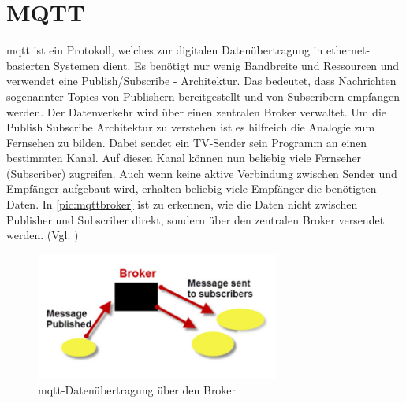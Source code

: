 \section{MQTT} %
\acrshort{mqtt} ist ein Protokoll, welches zur digitalen Datenübertragung in ethernet-basierten Systemen dient. Es benötigt nur wenig Bandbreite und Ressourcen und verwendet eine 
Publish/Subscribe - Architektur. Das bedeutet, dass Nachrichten sogenannter Topics von Publishern bereitgestellt und von Subscribern empfangen werden. Der Datenverkehr wird über einen 
zentralen Broker verwaltet. Um die Publish Subscribe Architektur zu verstehen ist es hilfreich die Analogie zum Fernsehen zu bilden. Dabei sendet ein TV-Sender sein Programm an einen bestimmten Kanal.
Auf diesen Kanal können nun beliebig viele Fernseher (Subscriber) zugreifen. Auch wenn keine aktive Verbindung zwischen Sender und Empfänger aufgebaut wird, erhalten beliebig viele Empfänger die benötigten Daten.
In \autoref{pic:mqttbroker} ist zu erkennen, wie die Daten nicht zwischen Publisher und Subscriber direkt, sondern über den zentralen Broker versendet werden. (Vgl. \cite{mqtt})

\begin{figure}[h]
    \begin{center}
        \includegraphics[width=8cm]{mqttbroker.png}
        \caption{\acrshort{mqtt}-Datenübertragung über den Broker}
        \label{pic:mqttbroker}
    \end{center}
\end{figure}